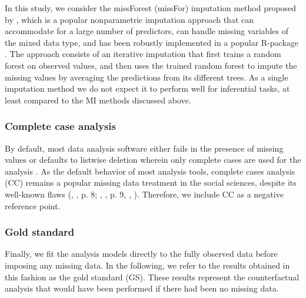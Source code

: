 	In this study, we consider the missForest (missFor) imputation method proposed by \cite{stekhovenBuhlmann:2011},
	which is a popular nonparametric imputation approach that can accommodate for a large number of predictors, 
	can handle missing variables of the mixed data type, and has been robustly implemented in a popular 
	R-package \citep{missForest}.
	The approach consists of an iterative imputation that first trains a random forest on observed values, and then 
	uses the trained random forest to impute the missing values by averaging the predictions from its different trees.
	As a single imputation method we do not expect it to perform well for inferential tasks, at least compared to 
	the MI methods discussed above.

\subsubsection{Complete case analysis}
	By default, most data analysis software either fails in the presence of missing values or defaults to listwise 
	deletion wherein only complete cases are used for the analysis \citep{R:2020, pandas:2020}.
	As the default behavior of most analysis tools, complete cases analysis (CC) remains a popular missing data treatment 
	in the social sciences, despite its well-known flaws (\citeauthor{rubin:1987}, \citeyear{rubin:1987}, p. 8; 
	\citeauthor{vanBuuren:2018}, \citeyear{vanBuuren:2018}, p. 9, \citeauthor{baraldiEnders:2010}, 
	\citeyear{baraldiEnders:2010}).
	Therefore, we include CC as a negative reference point.

\subsubsection{Gold standard}
	Finally, we fit the analysis models directly to the fully observed data before imposing any missing data. In the following, we refer to the results obtained in this fashion as the gold standard (GS). These results represent the counterfactual analysis that would have been performed if there had been no missing data.
